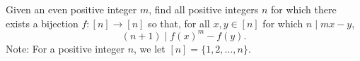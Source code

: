 Given an even positive integer $m$, find all positive integers $n$ for which there exists a bijection $f:[n]\to [n]$ so that, for all $x,y\in [n]$ for which $n\mid mx-y$, $$(n+1)\mid f(x)^m-f(y).$$
Note: For a positive integer $n$, we let $[n] = \{1,2,\dots, n\}$.

